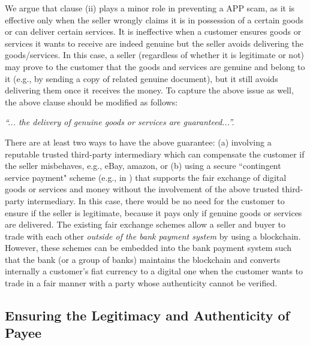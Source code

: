 We argue that    clause (ii) plays a minor role in  preventing a APP scam, as it is effective only when the seller wrongly claims it is in possession of a certain goods or can deliver certain services. It is ineffective when   a customer  ensures goods or services it wants to receive are indeed genuine but the seller avoids delivering the goods/services.  In this case, a seller (regardless of whether it is legitimate or not) may prove to the customer that the goods and services are genuine and belong to it (e.g., by sending a copy of related genuine  document), but it   still avoids delivering them once it receives the money. To capture the above issue as well, the above clause should be modified as follows: 

 
\begin{center}\textit{``... the delivery of genuine goods or services are guaranteed...''.}
 \end{center}
 
There are at least two ways to have the above guarantee: (a) involving a reputable trusted third-party intermediary which can compensate the customer if the seller misbehaves, e.g., eBay, amazon, or (b)  using a secure ``contingent service payment" scheme (e.g., in  \cite{CampanelliGGN17}) that supports the  fair exchange of digital goods or services and money without the involvement of the above trusted third-party intermediary. In this case, there would be no need for the customer to ensure if the seller is legitimate, because it pays only if  genuine goods or services are delivered. The existing fair exchange schemes  allow a seller and buyer to trade with each other \emph{outside of the bank payment system} by using a blockchain. However, these schemes can be embedded into the bank payment system such that the bank (or a group of banks) maintains the blockchain and converts internally  a customer's  fiat currency  to a digital one when the customer wants to trade in a fair manner with a party whose authenticity cannot be verified. 


\subsection{Ensuring the Legitimacy and Authenticity of Payee}

